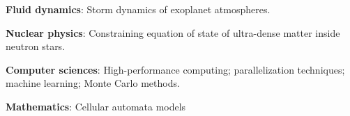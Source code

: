 \documentclass[10pt]{article}
\begin{document}
\noindent \textbf{Fluid dynamics}: 
\small{Storm dynamics of exoplanet atmospheres}.

\noindent \textbf{Nuclear physics}: 
\small{Constraining equation of state of ultra-dense matter inside neutron stars.}

\noindent \textbf{Computer sciences}: 
\small{High-performance computing; parallelization techniques; machine learning; Monte Carlo methods.}

\noindent \textbf{Mathematics}: \small{Cellular automata models}







\end{document}
